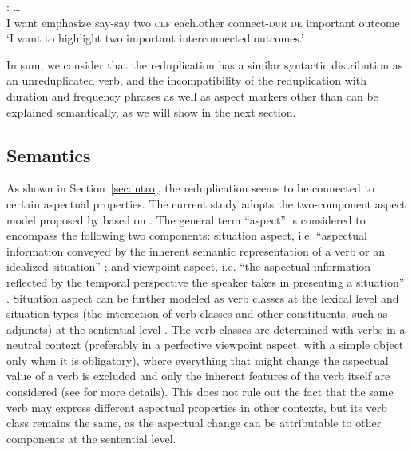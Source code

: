\ex \gll {}          : \ldots\\
I want emphasize say-say two \textsc{clf} each.other connect-\textsc{dur} \textsc{de} important outcome\\
\glt `I want to highlight two important interconnected outcomes.'
\z\z

In sum, we consider that the reduplication has a similar syntactic distribution as an unreduplicated verb,
and the incompatibility of the reduplication with duration and frequency phrases 
as well as aspect markers other than  can be explained semantically, 
as we will show in the next section.

\subsection{Semantics}\label{sec:sem}

As shown in Section~\ref{sec:intro}, the reduplication seems to be connected to certain aspectual properties.
The current study adopts the two-component aspect model proposed by \citet{XiaoMcEnery2004} based on \citet{Smith1991}.
The general term ``aspect'' is considered to encompass the following two components:
situation aspect, i.e. ``aspectual information conveyed by the inherent semantic representation of a verb or an idealized situation'' \citep[21]{XiaoMcEnery2004};
and viewpoint aspect, i.e. ``the aspectual information reflected by the temporal perspective the speaker takes in presenting a situation'' \citep[21]{XiaoMcEnery2004}.
Situation aspect can be further modeled as verb classes  at the lexical level
and situation types (the interaction of verb classes and other constituents, such as adjuncts) at the sentential level \citep[33]{XiaoMcEnery2004}.
The verb classes are determined with verbs in a neutral context (preferably in a perfective viewpoint aspect, with a simple object only when it is obligatory),
where everything that might change the aspectual value of a verb is excluded
and only the inherent features of the verb itself are considered
(see \citealt[52]{XiaoMcEnery2004} for more details).
This does not rule out the fact that the same verb may express different aspectual properties in other contexts,
but its verb class remains the same,
as the aspectual change can be attributable to other components at the sentential level.

